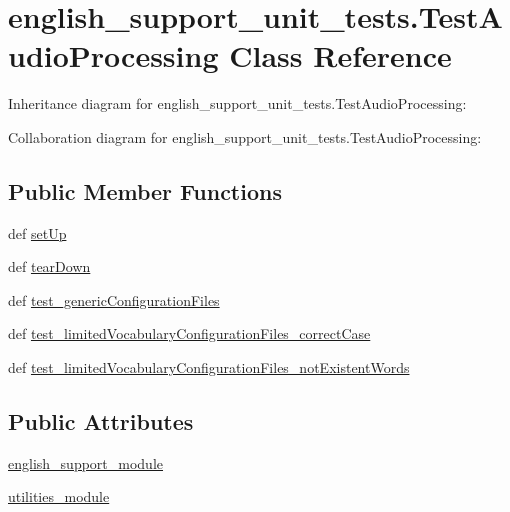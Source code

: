 \hypertarget{classenglish__support__unit__tests_1_1TestAudioProcessing}{\section{english\-\_\-support\-\_\-unit\-\_\-tests.\-Test\-Audio\-Processing Class Reference}
\label{classenglish__support__unit__tests_1_1TestAudioProcessing}
}


Inheritance diagram for english\-\_\-support\-\_\-unit\-\_\-tests.\-Test\-Audio\-Processing\-:


Collaboration diagram for english\-\_\-support\-\_\-unit\-\_\-tests.\-Test\-Audio\-Processing\-:
\subsection*{Public Member Functions}
\begin{DoxyCompactItemize}
\item 
def \hyperlink{classenglish__support__unit__tests_1_1TestAudioProcessing_a0c4275044a58bff1192579b87c86f71c}{set\-Up}
\item 
def \hyperlink{classenglish__support__unit__tests_1_1TestAudioProcessing_abddf049b5dbfd26903167694abab5506}{tear\-Down}
\item 
def \hyperlink{classenglish__support__unit__tests_1_1TestAudioProcessing_a49fe0076ebda8e012abf9e79d28b4049}{test\-\_\-generic\-Configuration\-Files}
\item 
def \hyperlink{classenglish__support__unit__tests_1_1TestAudioProcessing_aac1fc989bb8c79cf941f54febabe3f39}{test\-\_\-limited\-Vocabulary\-Configuration\-Files\-\_\-correct\-Case}
\item 
def \hyperlink{classenglish__support__unit__tests_1_1TestAudioProcessing_a0baa86921674f6631da9ac2c13f1d0ed}{test\-\_\-limited\-Vocabulary\-Configuration\-Files\-\_\-not\-Existent\-Words}
\end{DoxyCompactItemize}
\subsection*{Public Attributes}
\begin{DoxyCompactItemize}
\item 
\hyperlink{classenglish__support__unit__tests_1_1TestAudioProcessing_a382b4b85899f9b39d213de0ba1ab85d2}{english\-\_\-support\-\_\-module}
\item 
\hyperlink{classenglish__support__unit__tests_1_1TestAudioProcessing_a107b29275347e41f4d9b65d3934b0188}{utilities\-\_\-module}
\end{DoxyCompactItemize}


